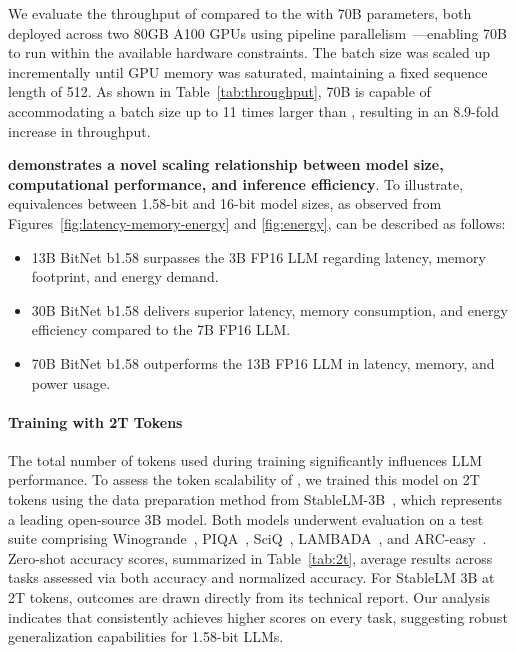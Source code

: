 We evaluate the throughput of  compared to the  with 70B parameters, both deployed across two 80GB A100 GPUs using pipeline parallelism~\cite{gpipe}—enabling  70B to run within the available hardware constraints. The batch size was scaled up incrementally until GPU memory was saturated, maintaining a fixed sequence length of 512. As shown in Table~\ref{tab:throughput},  70B is capable of accommodating a batch size up to 11 times larger than , resulting in an 8.9-fold increase in throughput.

\textbf{ demonstrates a novel scaling relationship between model size, computational performance, and inference efficiency}. To illustrate, equivalences between 1.58-bit and 16-bit model sizes, as observed from Figures~\ref{fig:latency-memory-energy} and \ref{fig:energy}, can be described as follows:

\begin{itemize}
    \item 13B BitNet b1.58 surpasses the 3B FP16 LLM regarding latency, memory footprint, and energy demand.
    \item 30B BitNet b1.58 delivers superior latency, memory consumption, and energy efficiency compared to the 7B FP16 LLM.
    \item 70B BitNet b1.58 outperforms the 13B FP16 LLM in latency, memory, and power usage.
\end{itemize}

\paragraph{Training with 2T Tokens}

The total number of tokens used during training significantly influences LLM performance. To assess the token scalability of , we trained this model on 2T tokens using the data preparation method from StableLM-3B~\cite{StableLM-3B-4E1T}, which represents a leading open-source 3B model. Both models underwent evaluation on a test suite comprising Winogrande~\cite{winoGrande}, PIQA~\cite{piqa}, SciQ~\cite{sciq}, LAMBADA~\cite{lambada}, and ARC-easy~\cite{arc}. Zero-shot accuracy scores, summarized in Table~\ref{tab:2t}, average results across tasks assessed via both accuracy and normalized accuracy. For StableLM 3B at 2T tokens, outcomes are drawn directly from its technical report. Our analysis indicates that  consistently achieves higher scores on every task, suggesting robust generalization capabilities for 1.58-bit LLMs.

